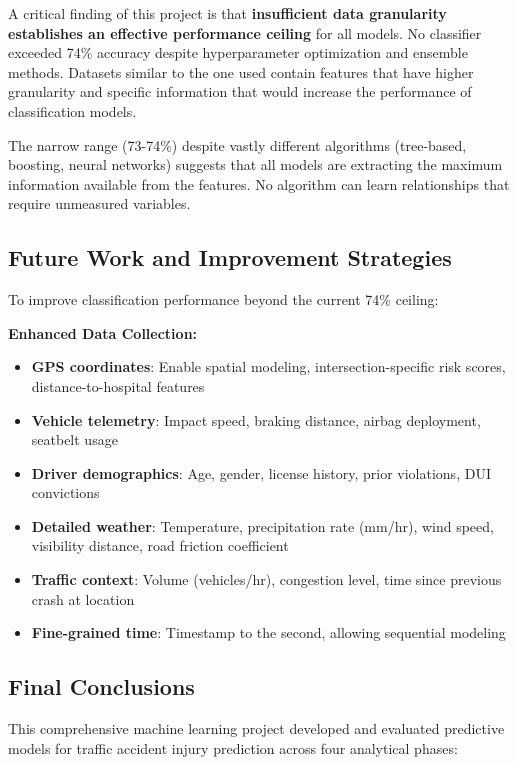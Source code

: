 \documentclass[stu,12pt,floatsintext]{apa7}
\begin{document}
A critical finding of this project is that \textbf{insufficient data granularity establishes an effective performance ceiling} for all models. 
No classifier exceeded 74\% accuracy despite hyperparameter optimization and ensemble methods. Datasets similar to the one used contain 
features that have higher granularity and specific information that would increase the performance of classification models. 

The narrow range (73-74\%) despite vastly different algorithms (tree-based, boosting, neural networks) suggests that all models 
are extracting the maximum information available from the features. No algorithm can learn relationships that require 
unmeasured variables.

\subsection{Future Work and Improvement Strategies}

To improve classification performance beyond the current 74\% ceiling:

\textbf{Enhanced Data Collection:}
\begin{itemize}
    \item \textbf{GPS coordinates}: Enable spatial modeling, intersection-specific risk scores, distance-to-hospital features
    \item \textbf{Vehicle telemetry}: Impact speed, braking distance, airbag deployment, seatbelt usage
    \item \textbf{Driver demographics}: Age, gender, license history, prior violations, DUI convictions
    \item \textbf{Detailed weather}: Temperature, precipitation rate (mm/hr), wind speed, visibility distance, road friction coefficient
    \item \textbf{Traffic context}: Volume (vehicles/hr), congestion level, time since previous crash at location
    \item \textbf{Fine-grained time}: Timestamp to the second, allowing sequential modeling
\end{itemize}

\subsection{Final Conclusions}

This comprehensive machine learning project developed and evaluated predictive models for traffic accident injury prediction across four analytical phases:
\end{document}
